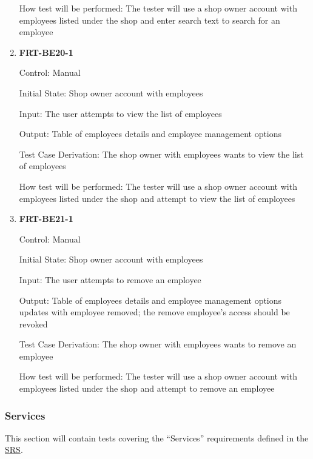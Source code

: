 \documentclass[12pt, titlepage]{article}
\begin{document}
\begin{enumerate}
	      How test will be performed: The tester will use a shop owner account with employees listed under
	      the shop and enter search text to search for an employee

	\item \textbf{FRT-BE20-1}

	      Control: Manual

	      Initial State: Shop owner account with employees

	      Input: The user attempts to view the list of employees

	      Output: Table of employees details and employee management options

	      Test Case Derivation: The shop owner with employees wants to view the list of employees

	      How test will be performed: The tester will use a shop owner account with employees listed under
	      the shop and attempt to view the list of employees

	\item \textbf{FRT-BE21-1}

	      Control: Manual

	      Initial State: Shop owner account with employees

	      Input: The user attempts to remove an employee

	      Output: Table of employees details and employee management options updates with employee removed;
	      the remove employee's access should be revoked

	      Test Case Derivation: The shop owner with employees wants to remove an employee

	      How test will be performed: The tester will use a shop owner account with employees listed under
	      the shop and attempt to remove an employee

\end{enumerate}

\subsubsection{Services}

This section will contain tests covering the ``Services'' requirements defined in the
\href{https://github.com/arkinmodi/project-sayyara/blob/main/docs/SRS/SRS.pdf}{SRS}.
\end{document}
